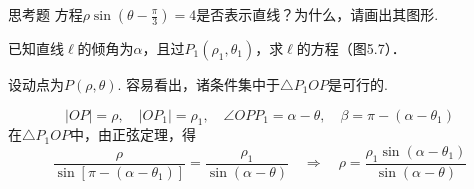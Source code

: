 \begin{thm}{思考题}
方程$\rho\sin\left(\theta-\frac{\pi}{3}\right)=4$是否表示直线？为什么，请画出其图形.
\end{thm}

\begin{example}
    已知直线$\ell$的倾角为$\alpha$，且过$P_1(\rho_1,\theta_1)$，求$\ell$的方程（图5.7）．
\end{example}

\begin{analyze}
     设动点为$P(\rho,\theta)$. 容易看出，诸条件集中于$\triangle P_1OP$是可行的.
\end{analyze}

\begin{solution}
\[|OP|=\rho,\quad  |OP_1|=\rho_1,\quad  \angle OPP_1=\alpha-\theta,\quad \beta=\pi-(\alpha-\theta_1)\]
    在$\triangle P_1OP$中，由正弦定理，得
\[\frac{\rho}{\sin[\pi-(\alpha-\theta_1)]}=\frac{\rho_1}{\sin(\alpha-\theta)}\quad \Rightarrow\quad \rho=\frac{\rho_1\sin(\alpha-\theta_1)}{\sin(\alpha-\theta)}\]
\end{solution}


